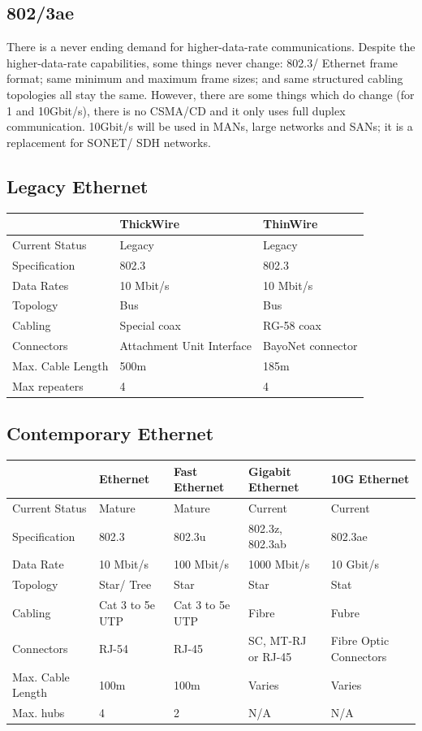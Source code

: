 \subsection*{802/3ae}
There is a never ending demand for higher-data-rate communications. Despite the higher-data-rate capabilities, some things never change: 802.3/ Ethernet frame format; same minimum and maximum frame sizes; and same structured cabling topologies all stay the same. However, there are some things which do change (for 1 and 10Gbit/s), there is no CSMA/CD and it only uses full duplex communication. 10Gbit/s will be used in MANs, large networks and SANs; it is a replacement for SONET/ SDH networks.

\subsection*{Legacy Ethernet}
\begin{table}[H]
    \centering
    \begin{tabularx}{0.6\textwidth}{X|XX}
     & \textbf{ThickWire} & \textbf{ThinWire} \\
    \hline
    Current Status & Legacy & Legacy \\
    Specification & 802.3 & 802.3 \\
    Data Rates & 10 Mbit/s & 10 Mbit/s \\
    Topology & Bus & Bus \\
    Cabling & Special coax & RG-58 coax \\
    Connectors & Attachment Unit Interface & BayoNet connector \\
    Max. Cable Length & 500m & 185m \\
    Max repeaters & 4 & 4\\
    \end{tabularx}
\end{table}

\subsection*{Contemporary Ethernet}
\begin{table}[H]
    \centering
    \begin{tabularx}{0.8\textwidth}{X|XXXX}
     & \textbf{Ethernet} & \textbf{Fast Ethernet} & \textbf{Gigabit Ethernet} & \textbf{10G Ethernet} \\
    \hline
    Current Status & Mature & Mature & Current & Current \\
    Specification & 802.3 & 802.3u & 802.3z, 802.3ab & 802.3ae \\
    Data Rate & 10 Mbit/s & 100 Mbit/s & 1000 Mbit/s & 10 Gbit/s \\
    Topology & Star/ Tree & Star & Star & Stat \\
    Cabling & Cat 3 to 5e UTP & Cat 3 to 5e UTP & Fibre & Fubre \\
    Connectors & RJ-54 & RJ-45 & SC, MT-RJ or RJ-45 & Fibre Optic Connectors \\
    Max. Cable Length & 100m & 100m & Varies & Varies \\
    Max. hubs & 4 & 2 & N/A & N/A
    \end{tabularx}
\end{table}

